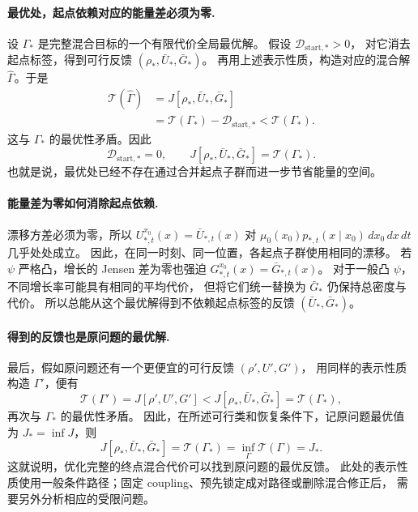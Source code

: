 \documentclass[UTF8,a4paper,11pt,fontset=fandol]{ctexart}
\begin{document}
\paragraph{最优处，起点依赖对应的能量差必须为零.}
设 $\Gamma_*$ 是完整混合目标的一个有限代价全局最优解。
假设 $\mathcal D_{\mathrm{start},*}>0$，
对它消去起点标签，得到可行反馈 $(\rho_*,\bar U_*,\bar G_*)$。
再用上述表示性质，构造对应的混合解 $\widehat\Gamma$。于是
\begin{equation}
\begin{aligned}
\mathcal T(\widehat\Gamma)
&=J[\rho_*,\bar U_*,\bar G_*]\\
&=\mathcal T(\Gamma_*)-\mathcal D_{\mathrm{start},*}
<\mathcal T(\Gamma_*).
\end{aligned}
\label{eq:strict-source-improvement}
\end{equation}
这与 $\Gamma_*$ 的最优性矛盾。因此
\begin{equation}
\boxed{\mathcal D_{\mathrm{start},*}=0,\qquad
J[\rho_*,\bar U_*,\bar G_*]=\mathcal T(\Gamma_*).}
\label{eq:optimal-source-gap}
\end{equation}
也就是说，最优处已经不存在通过合并起点子群而进一步节省能量的空间。

\paragraph{能量差为零如何消除起点依赖.}
漂移方差必须为零，所以
$U_{*,t}^{x_0}(x)=\bar U_{*,t}(x)$
对 $\mu_0(x_0)p_{*,t}(x\mid x_0)\,dx_0\,dx\,dt$ 几乎处处成立。
因此，在同一时刻、同一位置，各起点子群使用相同的漂移。
若 $\psi$ 严格凸，增长的 Jensen 差为零也强迫
$G_{*,t}^{x_0}(x)=\bar G_{*,t}(x)$。
对于一般凸 $\psi$，不同增长率可能具有相同的平均代价，
但将它们统一替换为 $\bar G_*$ 仍保持总密度与代价。
所以总能从这个最优解得到不依赖起点标签的反馈 $(\bar U_*,\bar G_*)$。

\paragraph{得到的反馈也是原问题的最优解.}
最后，假如原问题还有一个更便宜的可行反馈 $(\rho',U',G')$，
用同样的表示性质构造 $\Gamma'$，便有
\begin{equation}
\mathcal T(\Gamma')=J[\rho',U',G']
<J[\rho_*,\bar U_*,\bar G_*]=\mathcal T(\Gamma_*),
\end{equation}
再次与 $\Gamma_*$ 的最优性矛盾。
因此，在所述可行类和恢复条件下，记原问题最优值为 $J_*=\inf J$，则
\begin{equation}
\boxed{J[\rho_*,\bar U_*,\bar G_*]
=\mathcal T(\Gamma_*)=\inf_\Gamma\mathcal T(\Gamma)=J_*.}
\label{eq:equal-optimal-values}
\end{equation}
这就说明，优化完整的终点混合代价可以找到原问题的最优反馈。
此处的表示性质使用一般条件路径；固定 coupling、预先锁定成对路径或删除混合修正后，
需要另外分析相应的受限问题。
\end{document}
